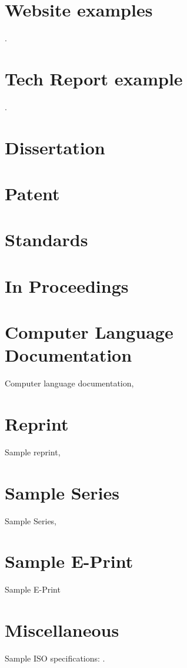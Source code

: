 \documentclass[preprint]{JASAnew}
\begin{document}
\citep{translation}


\section*{Website examples}

\citep{websiteauthyear}.

\section*{Tech Report example}

\citep{samptechreport6}.

\section*{Dissertation}
\citep{sampthesis}


\section*{Patent}

\citep{samppatent2}

\section*{Standards}

\citep{amstand,ansi}

\section*{In Proceedings}

\citep{sampinproceedings3}

\section*{Computer Language Documentation}
Computer language documentation, 

\citep{sampcode2}


\section*{Reprint}
Sample reprint, 
\citep{sampReprint}

\section*{Sample Series}
Sample Series, 

\citep{sampSeries}

\section*{Sample E-Print}
 Sample E-Print 
\citep{sampEprint}

\section*{Miscellaneous}
Sample ISO specifications: \citep{sampMisc}.


\end{document}
